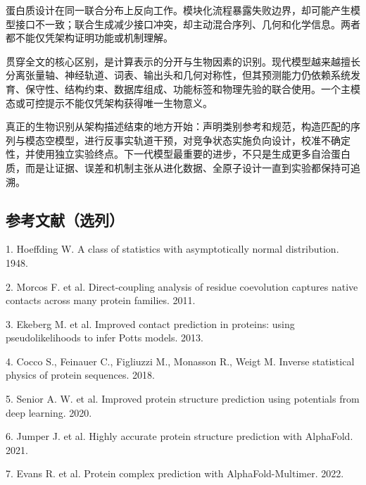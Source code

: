 \documentclass[10pt]{article}
\begin{document}
蛋白质设计在同一联合分布上反向工作。模块化流程暴露失败边界，却可能产生模型接口不一致；联合生成减少接口冲突，却主动混合序列、几何和化学信息。两者都不能仅凭架构证明功能或机制理解。\par

贯穿全文的核心区别，是计算表示的分开与生物因素的识别。现代模型越来越擅长分离张量轴、神经轨道、词表、输出头和几何对称性，但其预测能力仍依赖系统发育、保守性、结构约束、数据库组成、功能标签和物理先验的联合使用。一个主模态或可控提示不能仅凭架构获得唯一生物意义。\par

真正的生物识别从架构描述结束的地方开始：声明类别参考和规范，构造匹配的序列与模态空模型，进行反事实轨道干预，对竞争状态实施负向设计，校准不确定性，并使用独立实验终点。下一代模型最重要的进步，不只是生成更多自洽蛋白质，而是让证据、误差和机制主张从进化数据、全原子设计一直到实验都保持可追溯。\par

\subsection*{参考文献（选列）}


1. Hoeffding W. A class of statistics with asymptotically normal distribution. 1948.\par

2. Morcos F. et al. Direct-coupling analysis of residue coevolution captures native contacts across many protein families. 2011.\par

3. Ekeberg M. et al. Improved contact prediction in proteins: using pseudolikelihoods to infer Potts models. 2013.\par

4. Cocco S., Feinauer C., Figliuzzi M., Monasson R., Weigt M. Inverse statistical physics of protein sequences. 2018.\par

5. Senior A. W. et al. Improved protein structure prediction using potentials from deep learning. 2020.\par

6. Jumper J. et al. Highly accurate protein structure prediction with AlphaFold. 2021.\par

7. Evans R. et al. Protein complex prediction with AlphaFold-Multimer. 2022.\par
\end{document}
